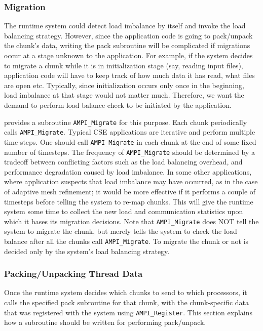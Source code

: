 \documentclass[10pt]{article}
\begin{document}
\subsubsection{Migration}

The \ampi{} runtime system could detect load imbalance by itself and invoke the
load balancing strategy. However, since the application code is going to
pack/unpack the chunk's data, writing the pack subroutine will be complicated
if migrations occur at a stage unknown to the application. For example, if the
system decides to migrate a chunk while it is in initialization stage (say,
reading input files), application code will have to keep track of how much data
it has read, what files are open etc. Typically, since initialization occurs
only once in the beginning, load imbalance at that stage would not matter much.
Therefore, we want the demand to perform load balance check to be initiated by
the application.

\ampi{} provides a subroutine \texttt{AMPI\_Migrate} for this purpose. Each
chunk periodically calls \texttt{AMPI\_Migrate}. Typical CSE applications are
iterative and perform multiple time-steps. One should call
\texttt{AMPI\_Migrate} in each chunk at the end of some fixed number of
timesteps. The frequency of \texttt{AMPI\_Migrate} should be determined by a
tradeoff between conflicting factors such as the load balancing overhead, and
performance degradation caused by load imbalance. In some other applications,
where application suspects that load imbalance may have occurred, as in the
case of adaptive mesh refinement; it would be more effective if it performs a
couple of timesteps before telling the system to re-map chunks. This will give
the \ampi{} runtime system some time to collect the new load and communication
statistics upon which it bases its migration decisions. Note that
\texttt{AMPI\_Migrate} does NOT tell the system to migrate the chunk, but
merely tells the system to check the load balance after all the chunks call
\texttt{AMPI\_Migrate}. To migrate the chunk or not is decided only by the
system's load balancing strategy.

\subsubsection{Packing/Unpacking Thread Data}

Once the \ampi{} runtime system decides which chunks to send to which
processors, it calls the specified pack subroutine for that chunk, with the
chunk-specific data that was registered with the system using
\texttt{AMPI\_Register}. This section explains how a subroutine should be
written for performing pack/unpack.
\end{document}

